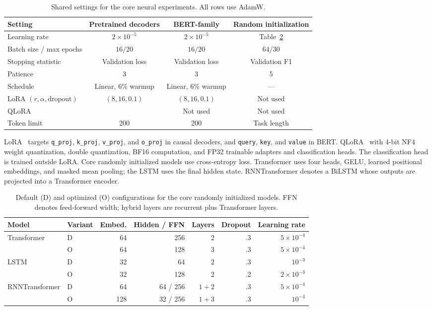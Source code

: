 \documentclass{article} %
\theoremstyle{plain}
\theoremstyle{definition}
\theoremstyle{remark}
\begin{document}
\begin{table}[htbp]
\centering\small
\caption{Shared settings for the core neural experiments. All rows use AdamW.}
\label{tab:llm_config}\label{tab:bert_config}\label{tab:dl_training}
\begin{tabular}{@{}lccc@{}}
\toprule
Setting & Pretrained decoders & BERT-family & Random initialization \\
\midrule
Learning rate & $2\times10^{-5}$ & $2\times10^{-5}$ & Table~\ref{tab:dl_optimal_config} \\
Batch size / max epochs & $16/20$ & $16/20$ & $64/30$ \\
Stopping statistic & Validation loss & Validation loss & Validation F1 \\
Patience & 3 & 3 & 5 \\
Schedule & Linear, 6\% warmup & Linear, 6\% warmup & --- \\
LoRA $(r,\alpha,\mathrm{dropout})$ & $(8,16,0.1)$ & $(8,16,0.1)$ & Not used \\
QLoRA  & &  Not used & Not used \\
Token limit & 200 & 200 & Task length \\
\bottomrule
\end{tabular}
\end{table}

LoRA~\citep{LoRA} targets \texttt{q\_proj}, \texttt{k\_proj},
\texttt{v\_proj}, and \texttt{o\_proj} in causal decoders, and
\texttt{query}, \texttt{key}, and \texttt{value} in BERT. QLoRA~\citep{qlora} with 4-bit NF4 weight quantization, double quantization, BF16 computation, and FP32 trainable adapters and classification heads. The classification head is trained outside LoRA. Core randomly initialized models use cross-entropy loss. Transformer uses four heads, GELU, learned positional embeddings, and masked mean pooling; the LSTM uses the final hidden state. RNNTransformer denotes a BiLSTM whose outputs are projected into a Transformer encoder. 

\begin{table}[htbp]
\centering\small
\caption{Default (D) and optimized (O) configurations for the core
randomly initialized models. FFN denotes feed-forward width; hybrid layers
are recurrent plus Transformer layers.}
\label{tab:dl_default_config}\label{tab:dl_optimal_config}
\begin{tabular}{@{}llrrrrr@{}}
\toprule
Model & Variant & Embed. & Hidden / FFN & Layers & Dropout & Learning rate \\
\midrule
Transformer & D & 64 & 256 & 2 & .3 & $5\times10^{-4}$ \\
            & O & 64 & 128 & 3 & .3 & $5\times10^{-4}$ \\
LSTM & D & 32 & 64 & 2 & .3 & $10^{-3}$ \\
     & O & 32 & 128 & 2 & .2 & $2\times10^{-3}$ \\
RNNTransformer & D & 64 & 64 / 256 & $1+2$ & .3 & $5\times10^{-4}$ \\
               & O & 128 & 32 / 256 & $1+3$ & .3 & $10^{-4}$ \\
\bottomrule
\end{tabular}
\end{table}
\end{document}
